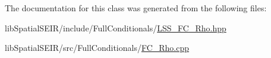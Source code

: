 The documentation for this class was generated from the following files\-:\begin{DoxyCompactItemize}
\item 
lib\-Spatial\-S\-E\-I\-R/include/\-Full\-Conditionals/\hyperlink{LSS__FC__Rho_8hpp}{L\-S\-S\-\_\-\-F\-C\-\_\-\-Rho.\-hpp}\item 
lib\-Spatial\-S\-E\-I\-R/src/\-Full\-Conditionals/\hyperlink{FC__Rho_8cpp}{F\-C\-\_\-\-Rho.\-cpp}\end{DoxyCompactItemize}
